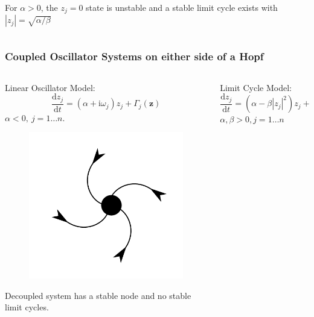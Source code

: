 \documentclass[10pt,reqno]{beamer}
\newcommand{\D}[2]{\frac{\mathrm{d} #1}{\mathrm{d} #2}}
\newcommand{\I}{\mathrm{i}}
\begin{document}
\begin{frame}
\begin{columns}[t]
\begin{column}{.49\textwidth}
\begin{figure}
\end{figure}
For $\alpha>0$, the $z_j=0$ state is unstable and a stable limit cycle exists with $|z_j| = \sqrt{\alpha/\beta}$				
\end{column}
\end{columns}
\end{frame}
\begin{frame}
\frametitle{Coupled Oscillator Systems on either side of a Hopf}
\begin{columns}[t]
\begin{column}{.49\textwidth}
\centering
Linear Oscillator Model:
\[
\D{z_j}{t} = (\alpha +\I\omega_j)z_j+\Gamma_j(\mathbf{z})
\]
$\alpha <0,\ j = 1\dots n$.
\begin{figure}
	\includegraphics[scale = 0.16]{node.png}
\end{figure}
Decoupled system has a stable node and no stable limit cycles.
\end{column}
\begin{column}{.49\textwidth}
\centering
Limit Cycle Model:
\[
\D{z_j}{t} = (\alpha - \beta|z_j|^2)z_j + \I\omega_jz_j +\Gamma_j(\mathbf{z})
\]
$\alpha,\beta>0, j = 1\dots n$
\begin{figure}

\end{figure}
\end{column}
\end{columns}
\end{frame}
\end{document}
